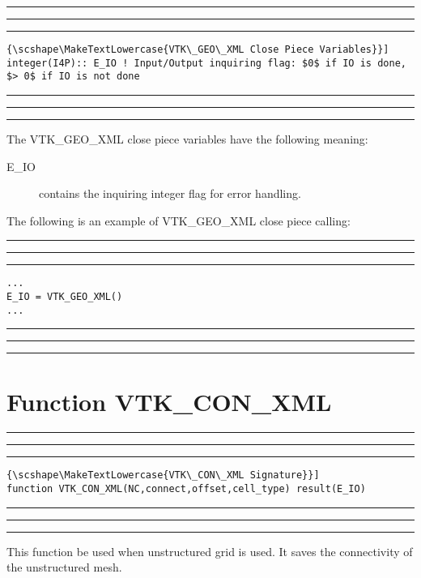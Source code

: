 \documentclass[pagesize=pdftex,fontsize=10pt,paper=a4,oneside]{scrbook}
\DeclareRobustCommand{\MarginNote}[1]{\marginpar{%
\slshape\footnotesize%
\parindent=0pt\lineskip=0pt\lineskiplimit=0pt%
\tolerance=2000\hyphenpenalty=300\exhyphenpenalty=300%
\doublehyphendemerits=100000\finalhyphendemerits=\doublehyphendemerits%
\raggedright\hspace{0pt}#1}}
\newenvironment{boxred}[1]%
               {%
                \noindent\hspace*{-0.025\textwidth}%
                \color{Maroon}%
                \rule[-5.8pt]{0.6pt}{6pt}\hspace*{-0.6pt}\rule{1.05\textwidth}{0.6pt}\hspace*{-0.6pt}\rule[-5.8pt]{0.6pt}{6pt}%
                \color{black}%
                \vspace*{0.6pt}\MarginNote{\color{Maroon}{#1}}%
               }%
               {%
                \noindent\hspace*{-0.025\textwidth}%
                \color{Maroon}%
                \rule[0pt]{0.6pt}{6pt}\hspace*{-0.6pt}\rule{1.05\textwidth}{0.6pt}\hspace*{-0.6pt}\rule[0pt]{0.6pt}{6pt}%
                \color{black}%
                \vspace*{2mm}%
               }
\DeclareRobustCommand{\MaiuscolettoBS}[1]{\textls[80]{\scshape\MakeTextLowercase{#1}}}
\begin{document}
\begin{boxred}{}
\begin{lstlisting}[style=variables,title=\color{Maroon}\MaiuscolettoBS{VTK\_GEO\_XML Close Piece Variables}]
integer(I4P):: E_IO ! Input/Output inquiring flag: $0$ if IO is done, $> 0$ if IO is not done
\end{lstlisting}
\end{boxred}

The VTK\_GEO\_XML close piece variables have the following meaning:

\begin{description}
 \item[{\color{RoyalBlue}E\_IO}] contains the inquiring integer flag for error handling.
\end{description}

The following is an example of VTK\_GEO\_XML close piece calling:

\begin{boxred}{VTK\_GEO\_XML Unstructured Grid Calling}
\begin{verbatim}
...
E_IO = VTK_GEO_XML()
...
\end{verbatim}
\end{boxred}





























\section{Function VTK\_CON\_XML}
\label{fun:VTK_CON_XML}
 
 
\begin{boxred}{}
\begin{lstlisting}[style=signature,title=\color{Maroon}\MaiuscolettoBS{VTK\_CON\_XML Signature}]
function VTK_CON_XML(NC,connect,offset,cell_type) result(E_IO)
\end{lstlisting}
\end{boxred}
 
This function \MaiuscolettoBS{must} be used when unstructured grid is used. It saves the connectivity of the unstructured mesh.
\end{document}
